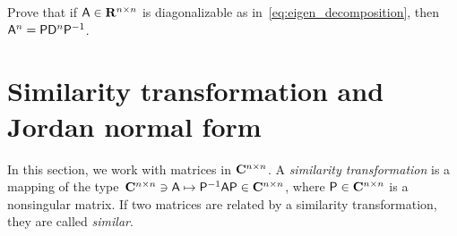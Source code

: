 \begin{exercise}
    Prove that if $\mathsf A \in \mathbf R^{n \times n}$ is diagonalizable as in~\eqref{eq:eigen_decomposition},
    then $\mathsf A^n = \mathsf P \mathsf D^n \mathsf P^{-1}$.
\end{exercise}

\section{Similarity transformation and Jordan normal form}%
\label{sec:similarity_transformation_and_jordan_normal_form}
In this section, we work with matrices in $\mathbf C^{n \times n}$.
A \emph{similarity transformation} is a mapping of the type~$\mathbf C^{n \times n} \ni \mathsf A \mapsto \mathsf P^{-1} \mathsf A \mathsf P \in \mathbf C^{n \times n}$,
where $\mathsf P \in \mathbf C^{n \times n}$ is a nonsingular matrix.
If two matrices are related by a similarity transformation,
they are called \emph{similar}.

